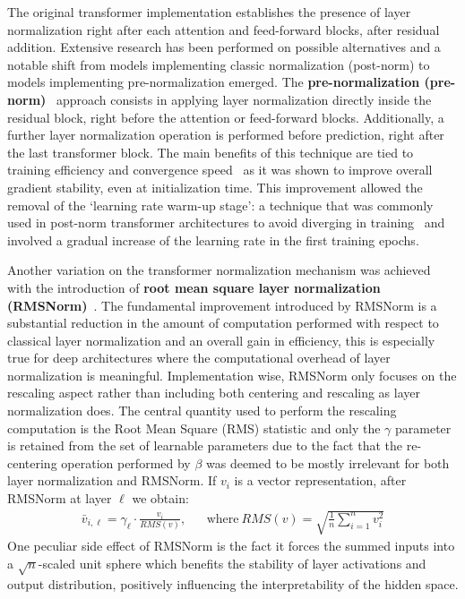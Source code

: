 The original transformer implementation establishes the presence of layer normalization right after each attention and feed-forward blocks, after residual addition.
Extensive research has been performed on possible alternatives and a notable shift from models implementing classic normalization (post-norm) to models implementing pre-normalization emerged.
The \textbf{pre-normalization (pre-norm)}~\cite{baevski2019,xiong2020} approach consists in applying layer normalization directly inside the residual block, right before the attention or feed-forward blocks.
Additionally, a further layer normalization operation is performed before prediction, right after the last transformer block.
The main benefits of this technique are tied to training efficiency and convergence speed~\cite{xiong2020} as it was shown to improve overall gradient stability, even at initialization time.
This improvement allowed the removal of the `learning rate warm-up stage': a technique that was commonly used in post-norm transformer architectures to avoid diverging in training~\cite{popel2018} and involved a gradual increase of the learning rate in the first training epochs.

Another variation on the transformer normalization mechanism was achieved with the introduction of \textbf{root mean square layer normalization (RMSNorm)}~\cite{zhang2019}.
The fundamental improvement introduced by RMSNorm is a substantial reduction in the amount of computation performed with respect to classical layer normalization and an overall gain in efficiency, this is especially true for deep architectures where the computational overhead of layer normalization is meaningful.
Implementation wise, RMSNorm only focuses on the rescaling aspect rather than including both centering and rescaling as layer normalization does.
The central quantity used to perform the rescaling computation is the Root Mean Square (RMS) statistic and only the $\gamma$ parameter is retained from the set of learnable parameters due to the fact that the re-centering operation performed by $\beta$ was deemed to be mostly irrelevant for both layer normalization and RMSNorm.
If $v_i$ is a vector representation, after RMSNorm at layer $\ell$ we obtain:
\begin{equation}
    \label{eq:background_rmsnorm}
    \begin{aligned}
        \bar v_{i,\ell} = \gamma_\ell \cdot \frac{v_i}{RMS(v)}, &&
        \text{where}\ RMS(v) = \sqrt{\frac{1}{n}\sum_{i=1}^{n}{v_i^2}}
    \end{aligned}
\end{equation}
One peculiar side effect of RMSNorm is the fact it forces the summed inputs into a $\sqrt{n}$-scaled unit sphere which benefits the stability of layer activations and output distribution, positively influencing the interpretability of the hidden space.

